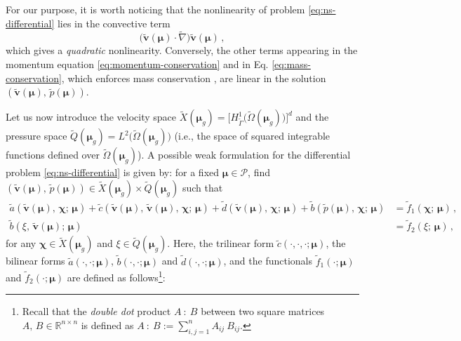 \documentclass[12pt, a4paper, twoside, openright, notitlepage]{report}
\numberwithin{equation}{chapter}
\theoremstyle{theorem}
\theoremstyle{definition}
\theoremstyle{remark}
\theoremstyle{proposition}
\numberwithin{figure}{chapter}
\newcommand{\wt}[1]{\widetilde{#1}}
\newcommand{\bg}[1]{\boldsymbol{#1}}
\begin{document}
		For our purpose, it is worth noticing that the nonlinearity of problem \eqref{eq:ns-differential} lies in the convective term
		\begin{equation*}
			\big( \wt{\bg{v}}(\bg{\mu}) \cdot \wt{\nabla} \big) \wt{\bg{v}}(\bg{\mu}) \, ,
		\end{equation*}
		which gives a \emph{quadratic} nonlinearity. Conversely, the other terms appearing in the momentum equation \eqref{eq:momentum-conservation} and in Eq. \eqref{eq:mass-conservation}, which enforces mass conservation \cite{QMN15}, are linear in the solution $(\wt{\bg{v}}(\bg{\mu}), \, \wt{p}(\bg{\mu}))$.
		
		Let us now introduce the velocity space $\wt{X}(\bg{\mu}_g) = \big[ H^1_{\wt{\Gamma}} \big( \wt{\Omega}(\bg{\mu}_g) \big) \big]^d$ and the pressure space $\wt{Q}(\bg{\mu}_g) = L^2 \big( \wt{\Omega}(\bg{\mu}_g) \big)$ (i.e., the space of squared integrable functions defined over $\wt{\Omega}(\bg{\mu}_g)$). A possible weak formulation for the differential problem \eqref{eq:ns-differential} is given by: for a fixed $\bg{\mu} \in \mathcal{P}$, find $(\wt{\bg{v}}(\bg{\mu}), \, \wt{p}(\bg{\mu})) \in \wt{X}(\bg{\mu}_g) \times \wt{Q}(\bg{\mu}_g)$ such that
		\begin{subequations}
			\label{eq:ns-weak}
			\begin{align}
				\label{eq:ns-weak-velocity}
				\wt{a}(\wt{\bg{v}}(\bg{\mu}), \, \bg{\chi}; \, \bg{\mu}) + \wt{c}(\wt{\bg{v}}(\bg{\mu}), \, \wt{\bg{v}}(\bg{\mu}), \, \bg{\chi}; \, \bg{\mu}) + \wt{d}(\wt{\bg{v}}(\bg{\mu}), \, \bg{\chi}; \, \bg{\mu}) + \wt{b}(\wt{p}(\bg{\mu}), \, \bg{\chi}; \, \bg{\mu}) & = \wt{f}_1(\bg{\chi}; \, \bg{\mu}) \, , \\
				\label{eq:ns-weak-pressure}
				\wt{b}(\xi, \, \wt{\bg{v}}(\bg{\mu}); \, \bg{\mu}) & = \wt{f}_2(\xi; \, \bg{\mu}) \, ,
			\end{align}
		\end{subequations}
		for any $\bg{\chi} \in \wt{X}(\bg{\mu}_g)$ and $\xi \in \wt{Q}(\bg{\mu}_g)$. Here, the trilinear form $\wt{c}(\cdot, \cdot, \cdot; \bg{\mu})$, the bilinear forms $\wt{a}(\cdot, \cdot; \bg{\mu})$, $\wt{b}(\cdot, \cdot; \bg{\mu})$ and $\wt{d}(\cdot, \cdot; \bg{\mu})$, and the functionals $\wt{f}_1(\cdot; \bg{\mu})$ and $\wt{f}_2(\cdot; \bg{\mu})$ are defined as follows\footnote{Recall that the \emph{double dot} product $A ~ : ~ B$ between two square matrices $A, \, B \in \mathbb{R}^{n \times n}$ is defined as $A ~ : ~ B := \sum_{i,j = 1}^n A_{ij} ~ B_{ij}$.}:
		\vspace*{-0.3cm}
\end{document}
